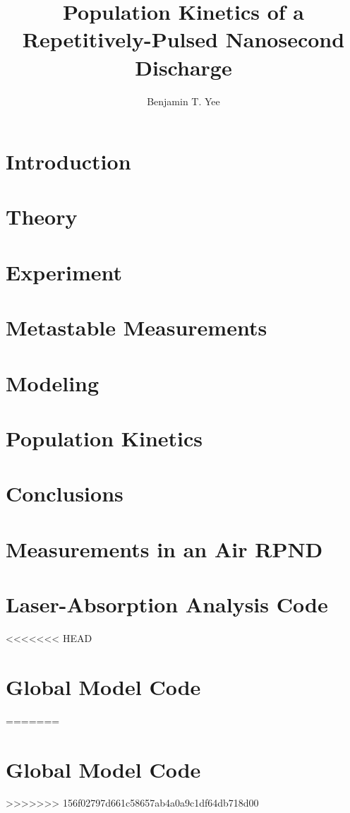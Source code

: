 \documentclass[12pt]{./tex/thesis-umich}
\title{Population Kinetics of a Repetitively-Pulsed Nanosecond Discharge}
\author{Benjamin T. Yee}
\begin{document}
  \chapter{Introduction}\label{chp:introduction}
    
  
  \chapter{Theory}\label{chp:theory}
    

  \chapter{Experiment}\label{chp:experiment}
    

  \chapter{Metastable Measurements}\label{chp:metastables}
    
  
  \chapter{Modeling}\label{chp:modeling}
    

  \chapter{Population Kinetics}\label{chp:emissions}
    

  \chapter{Conclusions}\label{chp:conclusions}

  \appendix
    \chapter{Measurements in an Air RPND}\label{chp:nasa}
      

    \chapter{Laser-Absorption Analysis Code}
<<<<<<< HEAD
      

    \chapter{Global Model Code}
      
=======

    \chapter{Global Model Code}
>>>>>>> 156f02797d661c58657ab4a0a9c1df64db718d00

  
  
\end{document}
